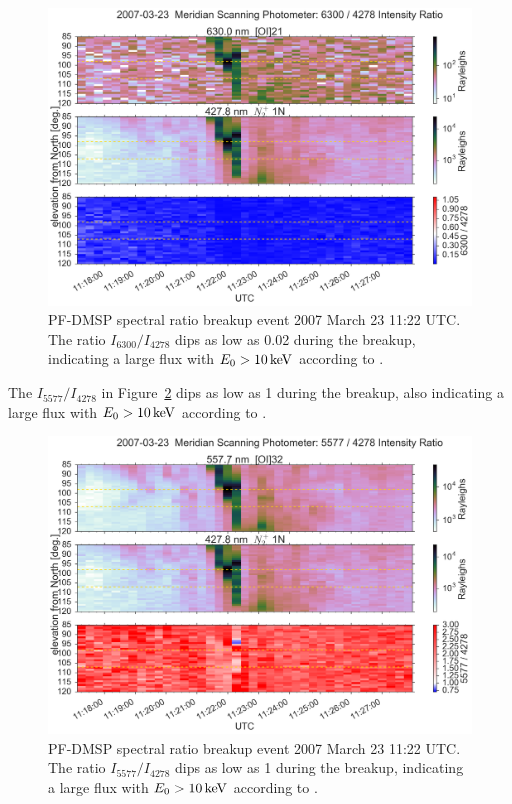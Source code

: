 \begin{figure}\centering
    \includegraphics[width=0.85\linewidth]{gfx/2007-03-23/msp-ratio}
    \caption{PF-DMSP spectral ratio breakup event 2007 March 23 11:22 UTC.
        The ratio $I_{6300}/I_{4278}$ dips as low as 0.02 during the breakup, indicating a large flux with $E_0 > \unit[10]{keV}$ according to \citet{rees1974}.}
    \label{fig:mspratio0323}
\end{figure}
The $I_{5577}/I_{4278}$ in Figure~\ref{fig:mspratio0323-5577} dips as low as 1 during the breakup, also indicating a large flux with $E_0 > \unit[10]{keV}$ according to \citet{rees1974}.
\begin{figure}\centering
    \includegraphics[width=0.85\linewidth]{gfx/2007-03-23/msp-ratio-5577}
    \caption{PF-DMSP spectral ratio breakup event 2007 March 23 11:22 UTC.
        The ratio $I_{5577}/I_{4278}$ dips as low as 1 during the breakup, indicating a large flux with $E_0 > \unit[10]{keV}$ according to \citet{rees1974}.}
    \label{fig:mspratio0323-5577}
\end{figure}
